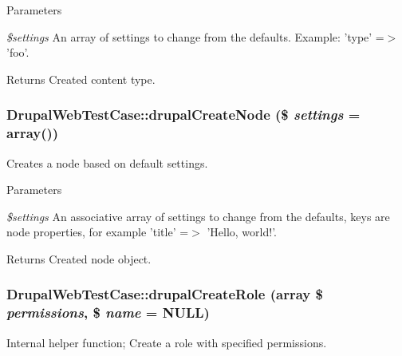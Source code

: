 \begin{DoxyParams}{Parameters}
\item[{\em \$settings}]An array of settings to change from the defaults. Example: 'type' =$>$ 'foo'. \end{DoxyParams}
\begin{DoxyReturn}{Returns}
Created content type. 
\end{DoxyReturn}
\hypertarget{class_drupal_web_test_case_a73daf1ecd169e59a2acc47d57f06572f}{
\subsubsection[{drupalCreateNode}]{\setlength{\rightskip}{0pt plus 5cm}DrupalWebTestCase::drupalCreateNode (\$ {\em settings} = {\ttfamily array()})}}
\label{class_drupal_web_test_case_a73daf1ecd169e59a2acc47d57f06572f}
Creates a node based on default settings.


\begin{DoxyParams}{Parameters}
\item[{\em \$settings}]An associative array of settings to change from the defaults, keys are node properties, for example 'title' =$>$ 'Hello, world!'. \end{DoxyParams}
\begin{DoxyReturn}{Returns}
Created node object. 
\end{DoxyReturn}
\hypertarget{class_drupal_web_test_case_ac704af37ef0e0d824af1407265bf750d}{
\subsubsection[{drupalCreateRole}]{\setlength{\rightskip}{0pt plus 5cm}DrupalWebTestCase::drupalCreateRole (array \$ {\em permissions}, \/  \$ {\em name} = {\ttfamily NULL})}}
\label{class_drupal_web_test_case_ac704af37ef0e0d824af1407265bf750d}
Internal helper function; Create a role with specified permissions.


